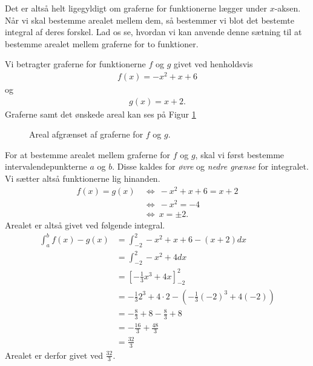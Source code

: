 Det er altså helt ligegyldigt om graferne for funktionerne lægger under $x$-aksen. Når vi skal bestemme arealet mellem dem, så bestemmer vi blot det bestemte integral af deres forskel. Lad os se, hvordan vi kan anvende denne sætning til at bestemme arealet mellem graferne for to funktioner. 
\begin{exa}
	Vi betragter graferne for funktionerne $f$ og $g$ givet ved henholdsvis
	\begin{align*}
		f(x) = -x^2 + x + 6
	\end{align*}
	 og 
	 \begin{align*}
	 	g(x) = x + 2.
	 \end{align*}
	 Graferne samt det ønskede areal kan ses på Figur \ref{fig:exa}
	 \begin{figure}[H]
	\centering
		\caption{Areal afgrænset af graferne for $f$ og $g$.}
		\label{fig:exa}
	\end{figure}
	For at bestemme arealet mellem graferne for $f$ og $g$, skal vi først bestemme intervalendepunkterne $a$ og $b$. 
	Disse kaldes for \textit{øvre} og \textit{nedre grænse} for integralet. Vi sætter altså funktionerne lig hinanden.
	\begin{align*}
		f(x) = g(x) \ &\Leftrightarrow \ -x^2 + x + 6 = x + 2 \\
		&\Leftrightarrow \ -x^2 = -4 \\
		&\Leftrightarrow \ x = \pm 2.
	\end{align*}
	Arealet er altså givet ved følgende integral.
	\begin{align*}
		\int_{a}^bf(x) - g(x) &= \int_{-2}^2 -x^2 + x + 6 -(x + 2) dx \\
		&= \int_{-2}^2 -x^2 +4 dx \\
		&= \left[-\frac{1}{3}x^3 + 4x\right]_{-2}^2 \\
		&= -\frac{1}{3}2^3 + 4\cdot 2 - \left(-\frac{1}{3}(-2)^3 + 4(-2)\right)\\
		&= -\frac{8}{3} + 8 - \frac{8}{3} + 8 \\
		&= -\frac{16}{3} + \frac{48}{3} \\
		&= \frac{32}{3} 
	\end{align*}
	Arealet er derfor givet ved $\frac{32}{3}$.
\end{exa}
